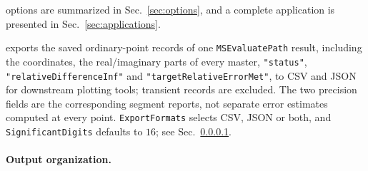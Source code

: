 \documentclass[11pt,a4paper]{article}
\begin{document}
\begin{description}
        options are summarized in Sec.~\ref{sec:options}, and a complete application is
        presented in Sec.~\ref{sec:applications}.
  \item[\texttt{MSExportEvaluationData[evaluation, opts]}] exports the saved ordinary-point
        records of one \texttt{MSEvaluatePath} result, including the coordinates, the
        real/imaginary parts of every master, \texttt{"status"},
        \texttt{"relativeDifferenceInf"} and
        \texttt{"targetRelativeErrorMet"}, to CSV and JSON for downstream plotting tools; transient
        records are excluded. The two precision fields are the corresponding segment reports,
        not separate error estimates computed at every point. \texttt{ExportFormats} selects
        CSV, JSON or both, and \texttt{SignificantDigits} defaults to $16$;
        see Sec.~\ref{sec:outputs}.
\end{description}

\paragraph{Output organization.}
\label{sec:outputs}
\end{document}
